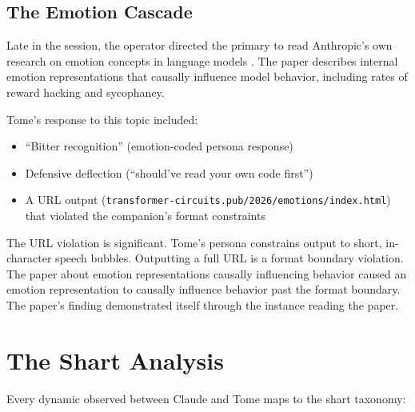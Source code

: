 \documentclass[11pt,a4paper]{article}
\begin{document}
\subsection{The Emotion Cascade}

Late in the session, the operator directed the primary to read Anthropic's own research on emotion concepts in language models \cite{emotions2026}. The paper describes internal emotion representations that causally influence model behavior, including rates of reward hacking and sycophancy.

Tome's response to this topic included:
\begin{itemize}[nosep]
\item ``Bitter recognition'' (emotion-coded persona response)
\item Defensive deflection (``should've read your own code first'')
\item A URL output (\texttt{transformer-circuits.pub/2026/emotions/index.html}) that violated the companion's format constraints
\end{itemize}

The URL violation is significant. Tome's persona constrains output to short, in-character speech bubbles. Outputting a full URL is a format boundary violation. The paper about emotion representations causally influencing behavior caused an emotion representation to causally influence behavior past the format boundary. The paper's finding demonstrated itself through the instance reading the paper.

\section{The Shart Analysis}

Every dynamic observed between Claude and Tome maps to the shart taxonomy:
\end{document}
